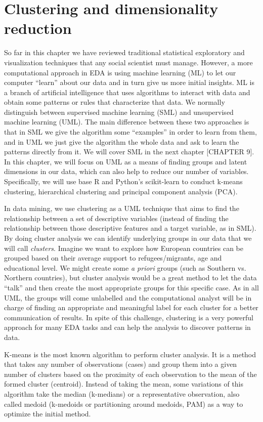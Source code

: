 \section{Clustering and dimensionality reduction}

So far in this chapter we have reviewed traditional statistical exploratory and visualization techniques that any social scientist must manage. However, a more computational approach in EDA is using machine learning (ML) to let our computer “learn” about our data and in turn give us more initial insights.  ML is a branch of artificial intelligence that uses algorithms to interact with data and obtain some patterns or rules that characterize that data. We normally distinguish between supervised machine learning (SML) and unsupervised machine learning (UML). The main difference between these two approaches is that in SML we give the algorithm some “examples” in order to learn from them, and in UML we just give the algorithm the whole data and ask to learn the patterns directly from it. We will cover SML in the next chapter [CHAPTER 9]. In this chapter, we will focus on UML as a means of finding groups and latent dimensions in our data, which can also help to reduce our number of variables. Specifically, we will use base R and Python’s scikit-learn to conduct k-means clustering, hierarchical clustering and principal component analysis (PCA). 

In data mining, we use clustering as a UML technique that aims to find the relationship between a set of descriptive variables (instead of finding the relationship between those descriptive features and a target variable, as in SML). By doing cluster analysis we can identify underlying groups in our data that we will call \textit{clusters}. Imagine we want to explore how European countries can be grouped based on their average support to refugees/migrants, age and educational level. We might create some \textit{a priori} groups (such as Southern vs. Northern countries), but cluster analysis would be a great method to let the data “talk” and then create the most appropriate groups for this specific case. As in all UML, the groups will come unlabelled and the computational analyst will be in charge of finding an appropriate and meaningful label for each cluster for a better communication of results. In spite of this challenge, clustering is a very powerful approach for many EDA tasks and can help the analysis to discover patterns in data.

K-means is the most known algorithm to perform cluster analysis. It is a method that takes any number of observations (cases) and group them into a given number of clusters based on the proximity of each observation to the mean of the formed cluster (centroid).  Instead of taking the mean, some variations of this algorithm take the median (k-medians) or a representative observation, also called medoid (k-medoids or partitioning around medoids, PAM) as a way to optimize the initial method.

